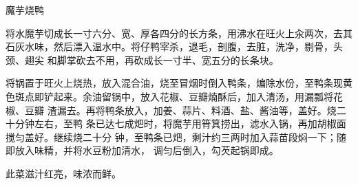 \begin{recipe}{魔芋烧鸭}

\ingredients


\preparation

\step 将水魔芋切成长一寸六分、宽、厚各四分的长方条，用沸水在旺火上汆两次，去其
石灰水味，然后漂入温水中。将仔鸭宰杀，退毛，剖腹，去脏，洗净，剔骨，头颈、翅尖
和脚掌砍去不用，再砍成长一寸半、宽五分的长条块。

\step 将锅置于旺火上烧热，放入混合油，烧至冒烟时倒入鸭条，煸除水份，至鸭条现黄
色斑点即铲起来。余油留锅中，放入花椒、豆瓣煵酥后，加入清汤，用漏瓢将花椒、豆瓣
渣漏去。再将鸭条放入，加姜、蒜片、料酒、盐、酱油等，盖好。烧二十分钟左右，至鸭
条已达七成𤆵时，将魔芋用筲箕捞出，滤水入锅，再加胡椒面搅匀盖好。继续烧二十分
钟，至鸭条已𤆵，剩汁约三两时加入蒜苗段焖一下；随即放入味精，并将水豆粉加清水，
调匀后倒入，勾芡起锅即成。

\features

此菜滋汁红亮，味浓而鲜。

\end{recipe}

